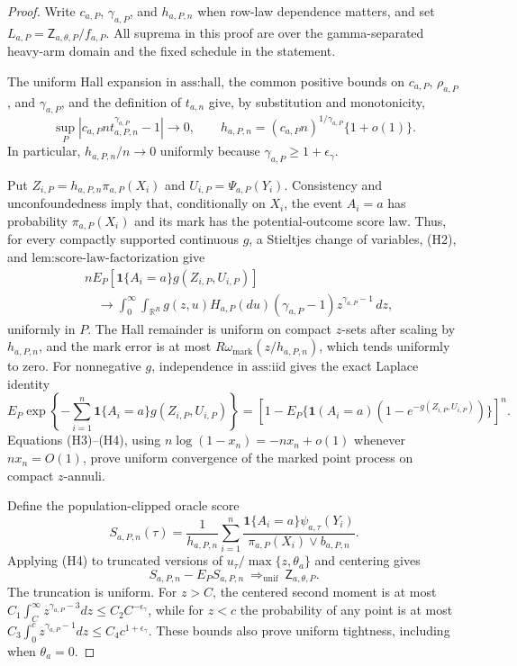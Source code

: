 \documentclass{article}
\begin{document}
\begin{proof}
Write \(c_{a,P}\), \(\gamma_{a,P}\), and \(h_{a,P,n}\) when row-law dependence matters, and set \(L_{a,P}=\mathsf Z_{a,\theta,P}/f_{a,P}\).  All suprema in this proof are over the gamma-separated heavy-arm domain and the fixed schedule in the statement.

The uniform Hall expansion in \(\text{ass:hall}\), the common positive bounds on \(c_{a,P}\), \(\rho_{a,P}\), and \(\gamma_{a,P}\), and the definition of \(t_{a,n}\) give, by substitution and monotonicity,
\[
\sup_P\left|c_{a,P}n t_{a,P,n}^{\gamma_{a,P}}-1\right|\longrightarrow0,
\qquad
h_{a,P,n}=(c_{a,P}n)^{1/\gamma_{a,P}}\{1+o(1)\}.
\tag{H2}
\]
In particular, \(h_{a,P,n}/n\to0\) uniformly because \(\gamma_{a,P}\ge1+\epsilon_\gamma\).

Put \(Z_{i,P}=h_{a,P,n}\pi_{a,P}(X_i)\) and \(U_{i,P}=\Psi_{a,P}(Y_i)\).  Consistency and unconfoundedness imply that, conditionally on \(X_i\), the event \(A_i=a\) has probability \(\pi_{a,P}(X_i)\) and its mark has the potential-outcome score law.  Thus, for every compactly supported continuous \(g\), a Stieltjes change of variables, (H2), and \(\text{lem:score-law-factorization}\) give
\[
\begin{split}
&nE_P\!\left[\mathbf1\{A_i=a\}g(Z_{i,P},U_{i,P})\right]\\
&\quad\longrightarrow
\int_0^\infty\!\int_{\mathbb R^R}g(z,u)H_{a,P}(du)
(\gamma_{a,P}-1)z^{\gamma_{a,P}-1}\,dz,
\end{split}
\tag{H3}
\]
uniformly in \(P\).  The Hall remainder is uniform on compact \(z\)-sets after scaling by \(h_{a,P,n}\), and the mark error is at most \(R\omega_{\mathrm{mark}}(z/h_{a,P,n})\), which tends uniformly to zero.  For nonnegative \(g\), independence in \(\text{ass:iid}\) gives the exact Laplace identity
\[
E_P\exp\!\left\{-\sum_{i=1}^n\mathbf1\{A_i=a\}g(Z_{i,P},U_{i,P})\right\}
=\left[1-E_P\{\mathbf1(A_i=a)(1-e^{-g(Z_{i,P},U_{i,P})})\}\right]^n.
\tag{H4}
\]
Equations (H3)--(H4), using \(n\log(1-x_n)=-nx_n+o(1)\) whenever \(nx_n=O(1)\), prove uniform convergence of the marked point process on compact \(z\)-annuli.

Define the population-clipped oracle score
\[
S_{a,P,n}(\tau)=\frac1{h_{a,P,n}}\sum_{i=1}^n
\frac{\mathbf1\{A_i=a\}\psi_{a,\tau}(Y_i)}
{\pi_{a,P}(X_i)\vee b_{a,P,n}}.
\tag{H5}
\]
Applying (H4) to truncated versions of \(u_\tau/\max\{z,\theta_a\}\) and centering gives
\[
S_{a,P,n}-E_PS_{a,P,n}\ \Longrightarrow_{\mathrm{unif}}\ \mathsf Z_{a,\theta,P}.
\tag{H6}
\]
The truncation is uniform.  For \(z>C\), the centered second moment is at most
\(C_1\int_C^\infty z^{\gamma_{a,P}-3}dz\le C_2C^{-\epsilon_\gamma}\), while for \(z<c\) the probability of any point is at most
\(C_3\int_0^c z^{\gamma_{a,P}-1}dz\le C_4c^{1+\epsilon_\gamma}\).  These bounds also prove uniform tightness, including when \(\theta_a=0\).


\end{proof}
\end{document}
